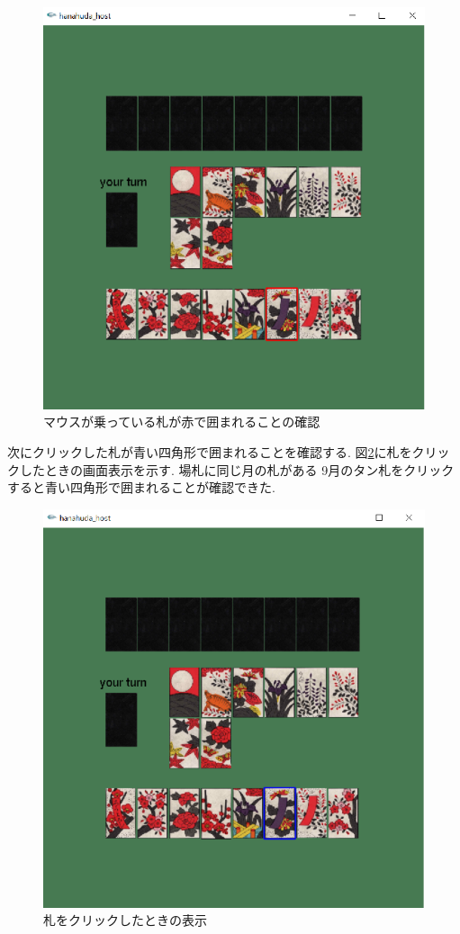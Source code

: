 \documentclass[a4j]{jarticle}
\begin{document}
    \begin{figure}[H]
    \centering
    \includegraphics[scale=1.0]{./img/select.eps}
    \caption{マウスが乗っている札が赤で囲まれることの確認}
    \label{selectred}
    \end{figure}

    次にクリックした札が青い四角形で囲まれることを確認する. 図\ref{clickblue}に札をクリックしたときの画面表示を示す. 場札に同じ月の札がある
    9月のタン札をクリックすると青い四角形で囲まれることが確認できた.

    \begin{figure}[H]
    \centering
    \includegraphics[scale=1.0]{./img/click.eps}
    \caption{札をクリックしたときの表示}
    \label{clickblue}
    \end{figure}
\end{document}
